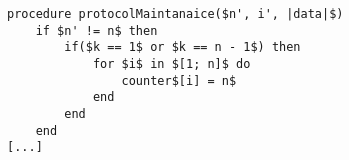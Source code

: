 \begin{lstlisting}[style=pseudocode, mathescape=true, float, label={lst:maintaniance1}, caption={Pseudocode additions to protocol maintaniance}, escapechar=\%] 
procedure protocolMaintanaice($n', i', |data|$)
	if $n' != n$ then
		if($k == 1$ or $k == n - 1$) then
			for $i$ in $[1; n]$ do
				counter$[i] = n$
			end
		end
	end
[...]
\end{lstlisting}  